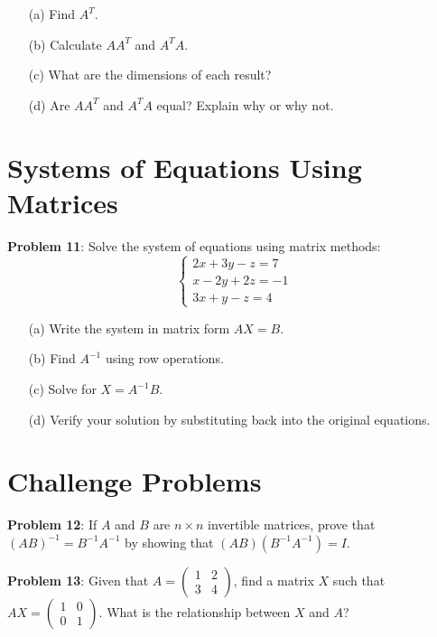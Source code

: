 \documentclass[11pt]{article}
\begin{document}
\begin{enumerate}
\item[(a)] Find $A^T$.
\item[(b)] Calculate $AA^T$ and $A^T A$.
\item[(c)] What are the dimensions of each result?
\item[(d)] Are $AA^T$ and $A^T A$ equal? Explain why or why not.
\end{enumerate}

\section{Systems of Equations Using Matrices}

\textbf{Problem 11}: Solve the system of equations using matrix methods:
$$\begin{cases}
2x + 3y - z = 7 \\
x - 2y + 2z = -1 \\
3x + y - z = 4
\end{cases}$$

\begin{enumerate}
\item[(a)] Write the system in matrix form $AX = B$.
\item[(b)] Find $A^{-1}$ using row operations.
\item[(c)] Solve for $X = A^{-1}B$.
\item[(d)] Verify your solution by substituting back into the original equations.
\end{enumerate}

\section{Challenge Problems}

\textbf{Problem 12}: If $A$ and $B$ are $n \times n$ invertible matrices, prove that $(AB)^{-1} = B^{-1}A^{-1}$ by showing that $(AB)(B^{-1}A^{-1}) = I$.

\textbf{Problem 13}: Given that $A = \begin{pmatrix} 1 & 2 \\ 3 & 4 \end{pmatrix}$, find a matrix $X$ such that $AX = \begin{pmatrix} 1 & 0 \\ 0 & 1 \end{pmatrix}$. What is the relationship between $X$ and $A$?

\newpage
\end{document}
